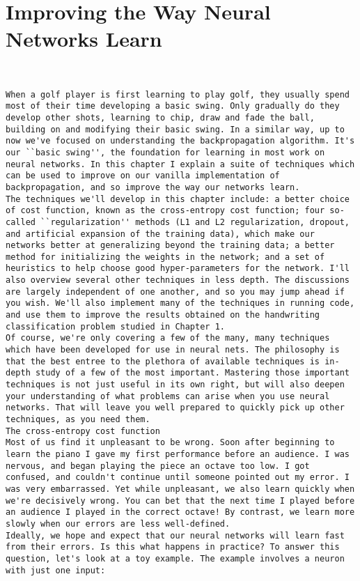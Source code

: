 
\chapter{Improving the Way Neural Networks Learn}
\label{sec:ImprovingTheWayNeuralNetworksLearn}

\begin{lstlisting}


When a golf player is first learning to play golf, they usually spend most of their time developing a basic swing. Only gradually do they develop other shots, learning to chip, draw and fade the ball, building on and modifying their basic swing. In a similar way, up to now we've focused on understanding the backpropagation algorithm. It's our ``basic swing'', the foundation for learning in most work on neural networks. In this chapter I explain a suite of techniques which can be used to improve on our vanilla implementation of backpropagation, and so improve the way our networks learn.
The techniques we'll develop in this chapter include: a better choice of cost function, known as the cross-entropy cost function; four so-called ``regularization'' methods (L1 and L2 regularization, dropout, and artificial expansion of the training data), which make our networks better at generalizing beyond the training data; a better method for initializing the weights in the network; and a set of heuristics to help choose good hyper-parameters for the network. I'll also overview several other techniques in less depth. The discussions are largely independent of one another, and so you may jump ahead if you wish. We'll also implement many of the techniques in running code, and use them to improve the results obtained on the handwriting classification problem studied in Chapter 1.
Of course, we're only covering a few of the many, many techniques which have been developed for use in neural nets. The philosophy is that the best entree to the plethora of available techniques is in-depth study of a few of the most important. Mastering those important techniques is not just useful in its own right, but will also deepen your understanding of what problems can arise when you use neural networks. That will leave you well prepared to quickly pick up other techniques, as you need them.
The cross-entropy cost function
Most of us find it unpleasant to be wrong. Soon after beginning to learn the piano I gave my first performance before an audience. I was nervous, and began playing the piece an octave too low. I got confused, and couldn't continue until someone pointed out my error. I was very embarrassed. Yet while unpleasant, we also learn quickly when we're decisively wrong. You can bet that the next time I played before an audience I played in the correct octave! By contrast, we learn more slowly when our errors are less well-defined.
Ideally, we hope and expect that our neural networks will learn fast from their errors. Is this what happens in practice? To answer this question, let's look at a toy example. The example involves a neuron with just one input:


\end{lstlisting}
